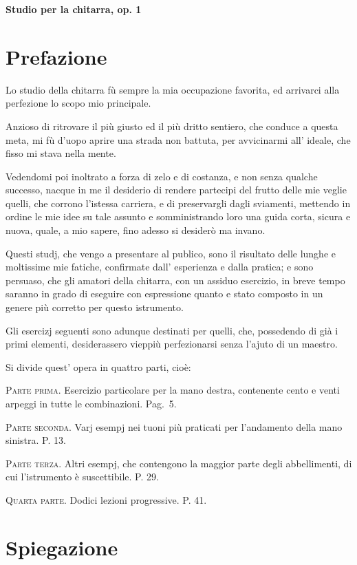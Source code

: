 \documentclass[a4paper]{article}
\newcommand*{\titleContent}{Studio per la chitarra, op. 1}
\begin{document}
\begin{titlepage}
  \begin{center}
    \Huge\bfseries\titleContent
  \end{center}
\end{titlepage}

\section*{Prefazione}

Lo studio della chitarra fù sempre la mia occupazione favorita, ed arrivarci alla perfezione lo scopo mio principale.

Anzioso di ritrovare il più giusto ed il più dritto sentiero, che conduce a questa meta, mi fù d'uopo aprire una strada non battuta, per avvicinarmi all' ideale, che fisso mi stava nella mente.

Vedendomi poi inoltrato a forza di zelo e di costanza, e non senza qualche successo, nacque in me il desiderio di rendere partecipi del frutto delle mie veglie quelli, che corrono l'istessa carriera, e di preservargli dagli sviamenti, mettendo in ordine le mie idee su tale assunto e somministrando loro una guida corta, sicura e nuova, quale, a mio sapere, fino adesso si desiderò ma invano.

Questi studj, che vengo a presentare al publico, sono il risultato delle lunghe e moltissime mie fatiche, confirmate %
dall' esperienza e dalla pratica; e sono persuaso, che gli amatori della chitarra, con un assiduo esercizio, in breve tempo saranno in grado di eseguire con espressione quanto e %
stato composto in un genere più corretto per questo istrumento.

Gli esercizj seguenti sono adunque destinati per quelli, che, possedendo di già i primi elementi, desiderassero vieppiù perfezionarsi senza l'ajuto di un maestro.

Si divide quest' opera in quattro parti, cioè:

\textsc{Parte prima}.  Esercizio particolare per la mano destra, contenente cento e venti arpeggi in tutte le combinazioni.  Pag.\ 5.

\textsc{Parte seconda}.  Varj esempj nei tuoni %
più praticati per l'andamento della mano sinistra.  P. 13.

\textsc{Parte terza}.  Altri esempj, che contengono la maggior parte degli abbellimenti, di cui l'istrumento è suscettibile.  P. 29.

\textsc{Quarta parte}.  Dodici lezioni progressive.  P. 41.

\section*{Spiegazione}
\end{document}
